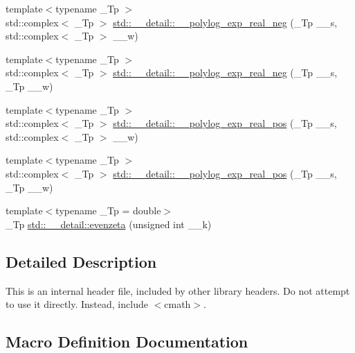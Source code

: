 \begin{DoxyCompactItemize}
\item 
{\footnotesize template$<$typename \+\_\+\+Tp $>$ }\\std\+::complex$<$ \+\_\+\+Tp $>$ \hyperlink{namespacestd_1_1____detail_abe2e38af779623f338c77dc46ac673bd}{std\+::\+\_\+\+\_\+detail\+::\+\_\+\+\_\+polylog\+\_\+exp\+\_\+real\+\_\+neg} (\+\_\+\+Tp \+\_\+\+\_\+s, std\+::complex$<$ \+\_\+\+Tp $>$ \+\_\+\+\_\+w)
\item 
{\footnotesize template$<$typename \+\_\+\+Tp $>$ }\\std\+::complex$<$ \+\_\+\+Tp $>$ \hyperlink{namespacestd_1_1____detail_ac9ae4e4771187bac37c1ccc83719feb2}{std\+::\+\_\+\+\_\+detail\+::\+\_\+\+\_\+polylog\+\_\+exp\+\_\+real\+\_\+neg} (\+\_\+\+Tp \+\_\+\+\_\+s, \+\_\+\+Tp \+\_\+\+\_\+w)
\item 
{\footnotesize template$<$typename \+\_\+\+Tp $>$ }\\std\+::complex$<$ \+\_\+\+Tp $>$ \hyperlink{namespacestd_1_1____detail_ab27023a3d94393d41c994000b2c16684}{std\+::\+\_\+\+\_\+detail\+::\+\_\+\+\_\+polylog\+\_\+exp\+\_\+real\+\_\+pos} (\+\_\+\+Tp \+\_\+\+\_\+s, std\+::complex$<$ \+\_\+\+Tp $>$ \+\_\+\+\_\+w)
\item 
{\footnotesize template$<$typename \+\_\+\+Tp $>$ }\\std\+::complex$<$ \+\_\+\+Tp $>$ \hyperlink{namespacestd_1_1____detail_ad77bb9953443dfb1575a61a4573c6913}{std\+::\+\_\+\+\_\+detail\+::\+\_\+\+\_\+polylog\+\_\+exp\+\_\+real\+\_\+pos} (\+\_\+\+Tp \+\_\+\+\_\+s, \+\_\+\+Tp \+\_\+\+\_\+w)
\item 
{\footnotesize template$<$typename \+\_\+\+Tp  = double$>$ }\\\+\_\+\+Tp \hyperlink{namespacestd_1_1____detail_af59bd2be508cc6a421ddf5dd70c93d97}{std\+::\+\_\+\+\_\+detail\+::evenzeta} (unsigned int \+\_\+\+\_\+k)
\end{DoxyCompactItemize}


\subsection{Detailed Description}
This is an internal header file, included by other library headers. Do not attempt to use it directly. Instead, include $<$cmath$>$. 

\subsection{Macro Definition Documentation}

